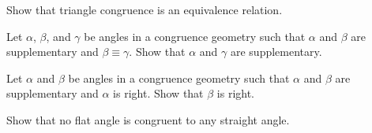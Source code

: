 \Exercises%

\begin{exercise}
Show that triangle congruence is an equivalence relation.
\end{exercise}

\begin{exercise}
Let \(\alpha\), \(\beta\), and \(\gamma\) be angles in a congruence geometry such that \(\alpha\) and \(\beta\) are supplementary and \(\beta \equiv \gamma\).
Show that \(\alpha\) and \(\gamma\) are supplementary.
\end{exercise}

\begin{exercise}
Let \(\alpha\) and \(\beta\) be angles in a congruence geometry such that \(\alpha\) and \(\beta\) are supplementary and \(\alpha\) is right.
Show that \(\beta\) is right.
\end{exercise}

\begin{exercise}
Show that no flat angle is congruent to any straight angle.
\end{exercise}
